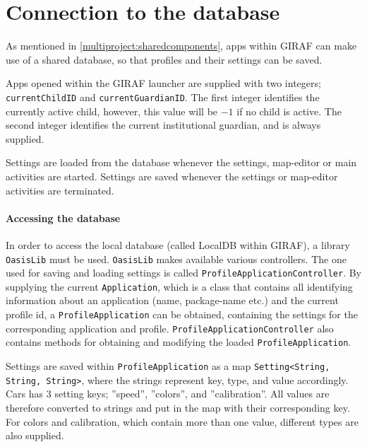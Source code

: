 \section{Connection to the database}
\label{sprint3:database}

As mentioned in \cref{multiproject:sharedcomponents}, apps within GIRAF can make use of a shared database, so that profiles and their settings can be saved.

Apps opened within the GIRAF launcher are supplied with two integers; \lstinline|currentChildID| and \lstinline|currentGuardianID|.
The first integer identifies the currently active child, however, this value will be $-1$ if no child is active.
The second integer identifies the current institutional guardian, and is always supplied.

Settings are loaded from the database whenever the settings, map-editor or main activities are started.
Settings are saved whenever the settings or map-editor activities are terminated.

\paragraph{Accessing the database}

In order to access the local database (called LocalDB within GIRAF), a library \lstinline|OasisLib| must be used.
\lstinline|OasisLib| makes available various controllers.
The one used for saving and loading settings is called \lstinline|ProfileApplicationController|.
By supplying the current \lstinline|Application|, which is a class that contains all identifying information about an application (name, package-name etc.) and the current profile id, a \lstinline|ProfileApplication| can be obtained, containing the settings for the corresponding application and profile.
\lstinline|ProfileApplicationController| also contains methods for obtaining and modifying the loaded \lstinline|ProfileApplication|.

Settings are saved within \lstinline|ProfileApplication| as a map \lstinline|Setting<String, String, String>|, where the strings represent key, type, and value accordingly.
Cars has 3 setting keys; ''speed'', ''colors'', and ''calibration''.
All values are therefore converted to strings and put in the map with their corresponding key. For colors and calibration, which contain more than one value, different types are also supplied.